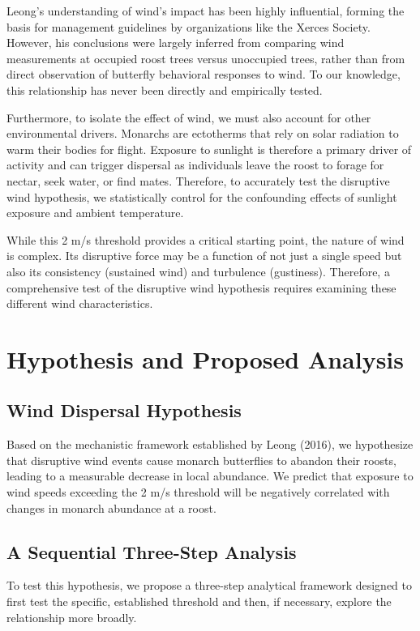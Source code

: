 Leong's understanding of wind's impact has been highly influential, forming the basis for management guidelines by organizations like the Xerces Society. However, his conclusions were largely inferred from comparing wind measurements at occupied roost trees versus unoccupied trees, rather than from direct observation of butterfly behavioral responses to wind. To our knowledge, this relationship has never been directly and empirically tested.

Furthermore, to isolate the effect of wind, we must also account for other environmental drivers. Monarchs are ectotherms that rely on solar radiation to warm their bodies for flight. Exposure to sunlight is therefore a primary driver of activity and can trigger dispersal as individuals leave the roost to forage for nectar, seek water, or find mates. Therefore, to accurately test the disruptive wind hypothesis, we statistically control for the confounding effects of sunlight exposure and ambient temperature.

While this 2 m/s threshold provides a critical starting point, the nature of wind is complex. Its disruptive force may be a function of not just a single speed but also its consistency (sustained wind) and turbulence (gustiness). Therefore, a comprehensive test of the disruptive wind hypothesis requires examining these different wind characteristics.

\section{Hypothesis and Proposed Analysis}

\subsection{Wind Dispersal Hypothesis}

Based on the mechanistic framework established by Leong (2016), we hypothesize that disruptive wind events cause monarch butterflies to abandon their roosts, leading to a measurable decrease in local abundance. We predict that exposure to wind speeds exceeding the 2 m/s threshold will be negatively correlated with changes in monarch abundance at a roost.

\subsection{A Sequential Three-Step Analysis}

To test this hypothesis, we propose a three-step analytical framework designed to first test the specific, established threshold and then, if necessary, explore the relationship more broadly.

